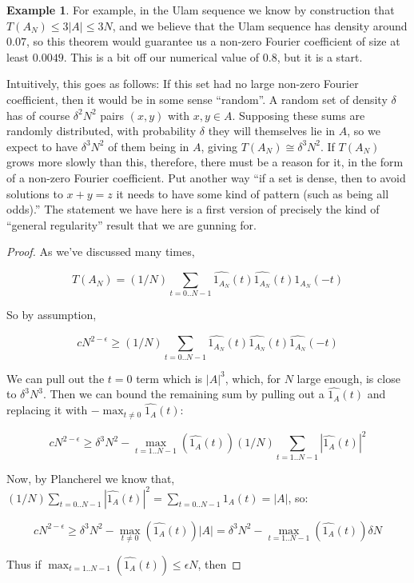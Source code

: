 \documentclass{article}
\theoremstyle{definition}
\newtheorem{example}{Example}
\theoremstyle{remark}
\numberwithin{equation}{section}
\begin{document}
{\begin{example}
  For example, in the Ulam sequence we know by construction that
  $T(A_N) \leq 3|A| \leq 3N$, and we believe that the Ulam sequence
  has density around $0.07$, so this theorem would guarantee us a
  non-zero Fourier coefficient of size at least $0.0049$.  This is a
  bit off our numerical value of $0.8$, but it is a start.
\end{example}

Intuitively, this goes as follows: If this set had no large non-zero
Fourier coefficient, then it would be in some sense ``random''.  A
random set of density $\delta$ has of course $\delta^2 N^2$ pairs
$(x,y)$ with $x,y \in A$.  Supposing these sums are randomly
distributed, with probability $\delta$ they will themselves lie in
$A$, so we expect to have $\delta^3 N^2$ of them being in $A$, giving
$T(A_N) \cong \delta^3 N^2$.  If $T(A_N)$ grows more slowly than this,
therefore, there must be a reason for it, in the form of a non-zero
Fourier coefficient.  Put another way ``if a set is dense, then to
avoid solutions to $x+y=z$ it needs to have some kind of pattern (such
as being all odds).''  The statement we have here is a first version
of precisely the kind of ``general regularity'' result that we are
gunning for.

\begin{proof}
  As we've discussed many times,

\[T(A_N) = (1/N) \sum_{t=0..N-1} \widehat{1_{A_N}}(t) \widehat{1_{A_N}}(t) \widehat{1_{A_N}}(-t)\]

So by assumption, 

\[cN^{2-\epsilon} \geq (1/N) \sum_{t=0..N-1} \widehat{1_{A_N}}(t) \widehat{1_{A_N}}(t) \widehat{1_{A_N}}(-t)\]

We can pull out the $t = 0$ term which is $|A|^3$, which, for $N$
large enough, is close to $\delta^3 N^3$.  Then we can bound the
remaining sum by pulling out a $\widehat{1_A}(t)$ and replacing it
with $-\max_{t\neq 0} \widehat{1_A}(t)$:

\[cN^{2-\epsilon} \geq \delta^3 N^2 - \max_{t=1..N-1}(\widehat{1_A}(t)) (1/N) \sum_{t=1..N-1} |\widehat{1_A}(t)|^2\]

Now, by Plancherel we know that,
$(1/N) \sum_{t=0..N-1} |\widehat{1_A}(t)|^2 = \sum_{t=0..N-1} 1_A(t) =
|A|$, so:

\[cN^{2-\epsilon} \geq \delta^3 N^2 - \max_{t\neq 0}(\widehat{1_A}(t))
|A| = \delta^3 N^2 - \max_{t=1..N-1}(\widehat{1_A}(t)) \delta N\]

Thus if $\max_{t=1..N-1}(\widehat{1_A}(t)) \leq \epsilon N$, then 


\end{proof}}
\end{document}

